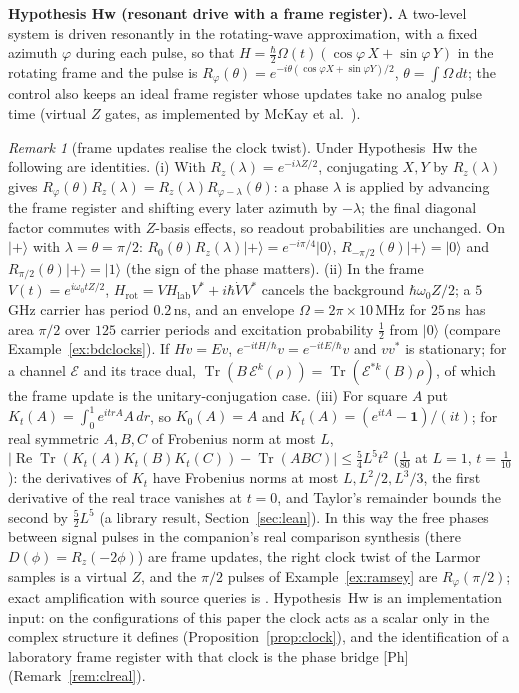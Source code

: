 \documentclass[aps,pra,onecolumn,superscriptaddress,nofootinbib,10pt]{revtex4-2}
\theoremstyle{definition}
\theoremstyle{remark}
\newtheorem{remark}[theorem]{Remark}
\newcommand{\re}{\operatorname{Re}}
\newcommand{\tr}{\operatorname{Tr}}
\begin{document}
\smallskip\noindent\textbf{Hypothesis Hw (resonant drive with a frame register).}\label{hyp:Hw}  A two-level system is driven
resonantly in the rotating-wave approximation, with a fixed azimuth $\varphi$ during each pulse, so that
$H=\tfrac\hbar2\Omega(t)(\cos\varphi\,X+\sin\varphi\,Y)$ in the rotating frame and the pulse is $R_\varphi(\theta)=e^{-i\theta(\cos\varphi X+\sin\varphi Y)/2}$, $\theta=\int\Omega\,dt$; the
control also keeps an ideal frame register whose updates take no analog pulse time (virtual $Z$ gates,
as implemented by McKay et al.\ \cite{m4:McKay}).

\begin{remark}[frame updates realise the clock twist]\label{rem:exframe}
Under Hypothesis~Hw the following are identities.  (i) With $R_z(\lambda)=e^{-i\lambda Z/2}$, conjugating $X,Y$ by $R_z(\lambda)$ gives
$R_\varphi(\theta)R_z(\lambda)=R_z(\lambda)R_{\varphi-\lambda}(\theta)$: a phase $\lambda$ is applied by advancing the frame register and shifting every later azimuth
by $-\lambda$; the final diagonal factor commutes with $Z$-basis effects, so readout probabilities are unchanged.  On $\lvert+\rangle$ with
$\lambda=\theta=\pi/2$: $R_0(\theta)R_z(\lambda)\lvert+\rangle=e^{-i\pi/4}\lvert0\rangle$, $R_{-\pi/2}(\theta)\lvert+\rangle=\lvert0\rangle$ and $R_{\pi/2}(\theta)\lvert+\rangle=\lvert1\rangle$ (the sign of the phase matters).
(ii) In the frame $V(t)=e^{i\omega_0tZ/2}$, $H_{\mathrm{rot}}=VH_{\mathrm{lab}}V^*+i\hbar\dot VV^*$ cancels the background $\hbar\omega_0Z/2$; a $5$\,GHz carrier has period $0.2$\,ns,
and an envelope $\Omega=2\pi\times10$\,MHz for $25$\,ns has area $\pi/2$ over $125$ carrier periods and excitation probability $\tfrac12$ from $\lvert0\rangle$
(compare Example~\ref{ex:bdclocks}).  If $Hv=Ev$, $e^{-itH/\hbar}v=e^{-itE/\hbar}v$ and $vv^*$ is stationary; for a channel $\mathcal E$ and its trace dual,
$\tr(B\,\mathcal E^k(\rho))=\tr(\mathcal E^{*k}(B)\rho)$, of which the frame update is the unitary-conjugation case.  (iii) For square $A$ put
$K_t(A)=\int_0^1e^{itrA}A\,dr$, so $K_0(A)=A$ and $K_t(A)=(e^{itA}-\mathbf1)/(it)$; for real symmetric $A,B,C$ of Frobenius norm at most $L$,
$\lvert\re\tr(K_t(A)K_t(B)K_t(C))-\tr(ABC)\rvert\le\tfrac54L^5t^2$ ($\tfrac1{80}$ at $L=1$, $t=\tfrac1{10}$): the derivatives of $K_t$ have Frobenius norms at most $L,L^2/2,L^3/3$,
the first derivative of the real trace vanishes at $t=0$, and Taylor's remainder bounds the second by $\tfrac52L^5$ (a library result,
Section~\ref{sec:lean}).  In this way the free phases between signal pulses in the companion's real comparison synthesis
\cite[Thm.~6A.1]{PaperI} (there $D(\phi)=R_z(-2\phi)$) are frame updates, the right clock twist of the Larmor samples is a
virtual $Z$, and the $\pi/2$ pulses of Example~\ref{ex:ramsey} are $R_\varphi(\pi/2)$; exact amplification with source queries is
\cite[Prop.~6A.8]{PaperI}.  Hypothesis~Hw is an implementation input: on the configurations of this paper the clock
acts as a scalar only in the complex structure it defines (Proposition~\ref{prop:clock}), and the identification of
a laboratory frame register with that clock is the phase bridge [Ph] (Remark~\ref{rem:clreal}).
\end{remark}
\end{document}
